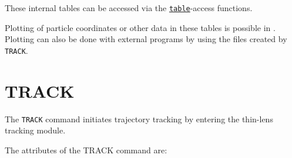 These internal tables can be accessed via the
\href{../Introduction/expression.html#table}{\texttt{table}}-access
functions.      

Plotting of particle coordinates or other data in these tables is
possible in \madx. Plotting can also be done with external programs by
using the files created by \texttt{TRACK}.  




\section{TRACK}
\label{sec:track}

The \texttt{TRACK} command initiates trajectory tracking by entering the 
thin-lens tracking module. 


The attributes of the TRACK command are:

